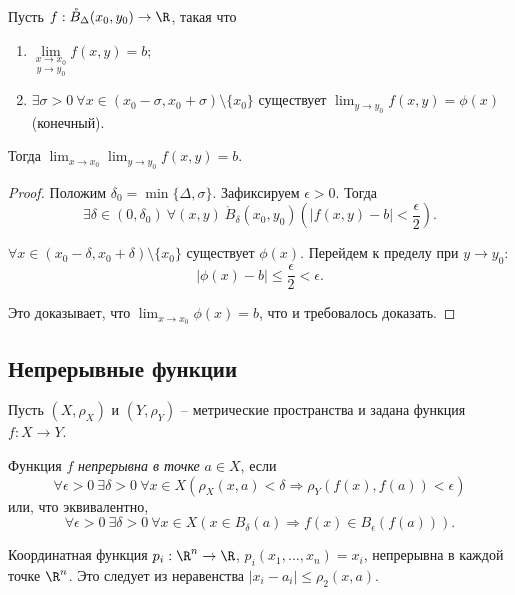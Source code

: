 \begin{lemma}
    Пусть $f: \mathring{B}_{\Delta}(x_{0}, y_{0}) \to \R$, такая что
    \begin{enumerate}
        \item $\underset{y \to y_{0}}{\underset{x \to x_{0}}{\lim}} f(x, y) = b$; 
        \item $\exists \sigma > 0 \ \forall x \in (x_{0} - \sigma, x_{0} + \sigma) \setminus \{x_{0}\}$ существует $\lim_{y \to y_{0}} f(x, y) = \phi(x)$ (конечный).
    \end{enumerate}
    Тогда $\lim_{x \to x_{0}}\lim_{y \to y_{0}}f(x, y) = b$.
\end{lemma}

\begin{proof}
    Положим $\delta_{0} = \min\{\Delta, \sigma\}$. Зафиксируем $\epsilon > 0$. Тогда
    \[\exists \delta \in (0, \delta_{0}) \ \forall (x, y) \ \mathring{B}_{\delta}(x_{0}, y_{0})\left(|f(x, y) - b| < \frac{\epsilon}{2}\right).\]

    $\forall x \in (x_{0} - \delta, x_{0} + \delta) \setminus \{x_{0}\}$ существует $\phi(x)$. Перейдем к пределу при $y \to y_{0}$:
    \[|\phi(x) - b| \leq \frac{\epsilon}{2} < \epsilon.\]

    Это доказывает, что $\lim_{x \to x_{0}}\phi(x) = b$, что и требовалось доказать.
\end{proof}

\subsection{Непрерывные функции}

Пусть $(X, \rho_{X})$ и $(Y, \rho_{Y})$ -- метрические пространства и задана функция $f: X \to Y$.

\begin{definition}
    Функция $f$ \textit{непрерывна в точке} $a \in X$, если
    \[\forall \epsilon > 0 \ \exists \delta > 0 \ \forall x \in X \left(\rho_{X}(x, a) < \delta \Rightarrow \rho_{Y}(f(x), f(a)) < \epsilon\right)\]
    или, что эквивалентно,
    \[\forall \epsilon > 0 \ \exists \delta > 0 \ \forall x \in X \left(x \in B_{\delta}(a) \Rightarrow f(x) \in B_{\epsilon}(f(a))\right).\]
\end{definition}

\begin{example}
    Координатная функция $p_{i}: \R^{n} \to \R$, $p_{i}(x_{1}, \ldots, x_{n}) = x_{i}$, непрерывна в каждой точке $\R^{n}$. Это следует из неравенства $|x_{i} - a_{i}| \leq \rho_{2}(x, a)$.
\end{example}

